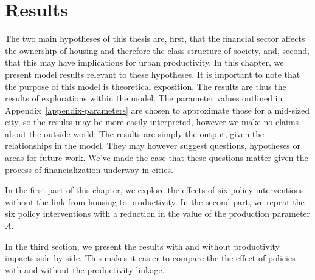 \chapter{Results} \label{chapter-results}

The two main hypotheses of this thesis are, first, that the financial sector affects the ownership of housing and therefore the class structure of society, and, second, that this may have implications for urban productivity.  In this chapter, we present model results relevant to these hypotheses. It is important to note that the purpose of this model is \gls{theoretical exposition}. The results are thus the results of explorations within the model. The parameter values outlined in Appendix~\ref{appendix-parameters} are chosen to approximate those for a mid-sized city, so the results may be more easily interpreted, however we make no claims about the outside world. %
The results are simply the output, given the relationships in the model. They may however suggest questions, hypotheses or areas for future work. We've made the case that these questions matter given the process of financialization underway in cities. 

In the first part of this chapter, we explore the effects of six policy interventions without the link from housing to productivity. In the second part, we repeat the six policy interventions with a %
reduction in the value of the production parameter $A$.

In the third section, we present the results with and without productivity impacts side-by-side. This makes it easier to compare the the effect of policies with and without the productivity linkage. 

